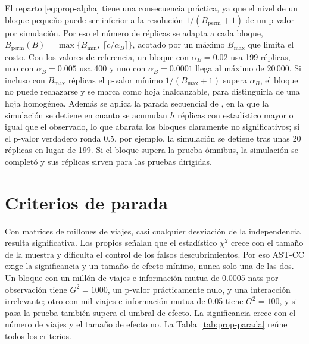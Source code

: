 El reparto \eqref{eq:prop-alpha} tiene una consecuencia práctica, ya que el nivel de un
bloque pequeño puede ser inferior a la resolución $1/(B_{\mathrm{perm}}+1)$ de
un p-valor por simulación. Por eso el número de réplicas se adapta a cada
bloque, $B_{\mathrm{perm}}(B) = \max\{B_{\min},\ \lceil c/\alpha_B\rceil\}$,
acotado por un máximo $B_{\max}$ que limita el costo. Con los valores de
referencia, un bloque con $\alpha_B=0.02$ usa 199 réplicas, uno con $\alpha_B=0.005$
usa 400 y uno con $\alpha_B=0.0001$ llega al máximo de 20\,000. Si incluso con $B_{\max}$
réplicas el p-valor mínimo $1/(B_{\max}+1)$ supera $\alpha_B$, el bloque no
puede rechazarse y se marca como hoja inalcanzable, para distinguirla de
una hoja homogénea. Además se aplica la parada secuencial de \cite{Besag1991},
en la que la simulación se detiene en cuanto se acumulan $h$ réplicas con estadístico
mayor o igual que el observado, lo que abarata los bloques claramente no
significativos; si el p-valor verdadero ronda 0.5, por ejemplo, la simulación se
detiene tras unas 20 réplicas en lugar de 199. Si el bloque supera la prueba ómnibus, la simulación se completó
y sus réplicas sirven para las pruebas dirigidas.

\section{Criterios de parada}\label{sec:prop-parada}

Con matrices de millones de viajes, casi cualquier desviación de la
independencia resulta significativa. Los propios \cite{Hu2025} señalan que el
estadístico $\chi^2$ crece con el tamaño de la muestra y dificulta el control de
los falsos descubrimientos. Por eso AST-CC exige la significancia y un
tamaño de efecto mínimo, nunca solo una de las dos. Un bloque con un millón de
viajes e información mutua de 0.0005 nats por observación tiene $G^2 = 1000$, un
p-valor prácticamente nulo, y una interacción irrelevante; otro con mil viajes e
información mutua de 0.05 tiene $G^2=100$, y si pasa la prueba también supera el
umbral de efecto. La significancia crece con el número de viajes y el tamaño de
efecto no. La Tabla~\ref{tab:prop-parada} reúne todos los criterios.

